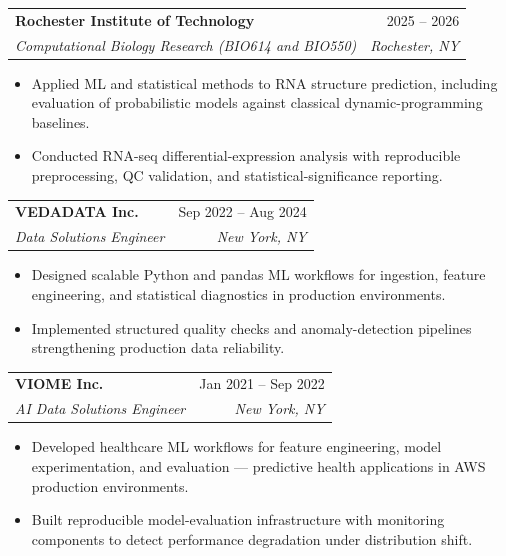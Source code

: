 \documentclass[11pt]{article}
\makeatletter
\newcommand{\entry}[4]{
  \noindent\begin{tabularx}{\textwidth}{@{}Xr@{}}
    \textbf{#1} & #2 \\
    \textit{#3} & \textit{#4}
  \end{tabularx}\vspace{2pt}
}
\makeatother
\begin{document}
\entry{Rochester Institute of Technology}{2025 -- 2026}{Computational Biology Research (BIO614 and BIO550)}{Rochester, NY}
\begin{itemize}
  \item Applied ML and statistical methods to RNA structure prediction, including evaluation of probabilistic models against classical dynamic-programming baselines.
  \item Conducted RNA-seq differential-expression analysis with reproducible preprocessing, QC validation, and statistical-significance reporting.
\end{itemize}

\entry{VEDADATA Inc.}{Sep 2022 -- Aug 2024}{Data Solutions Engineer}{New York, NY}
\begin{itemize}
  \item Designed scalable Python and pandas ML workflows for ingestion, feature engineering, and statistical diagnostics in production environments.
  \item Implemented structured quality checks and anomaly-detection pipelines strengthening production data reliability.
\end{itemize}

\entry{VIOME Inc.}{Jan 2021 -- Sep 2022}{AI Data Solutions Engineer}{New York, NY}
\begin{itemize}
  \item Developed healthcare ML workflows for feature engineering, model experimentation, and evaluation --- predictive health applications in AWS production environments.
  \item Built reproducible model-evaluation infrastructure with monitoring components to detect performance degradation under distribution shift.
\end{itemize}
\end{document}
